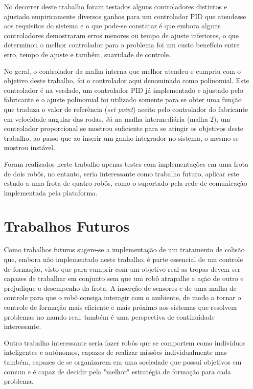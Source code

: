 No decorrer deste trabalho foram testados alguns controladores distintos e ajustado empiricamente diversos ganhos para um controlador PID que atendesse aos requisitos do sistema e o que pode-se constatar é que embora alguns controladores demostraram erros menores ou tempo de ajuste inferiores, o que determinou o melhor controlador para o problema foi um custo benefício entre erro, tempo de ajuste e também, suavidade de controle. 

No geral, o controlador da malha interna que melhor atendeu e cumpriu com o objetivo deste trabalho, foi o controlador aqui denominado como polinomial. %
Este controlador é na verdade, um controlador PID já implementado e ajustado pelo fabricante e o ajuste polinomial foi utilizado somente para se obter uma função que traduza o valor de referência (\emph{set point}) aceito pelo controlador do fabricante em velocidade angular das rodas. Já na malha intermediária (malha 2), um controlador proporcional se mostrou suficiente para se atingir os objetivos deste trabalho, ao passo que ao inserir um ganho integrador no sistema, o mesmo se mostrou instável.

Foram realizados neste trabalho apenas testes com implementações em uma frota de dois robôs, no entanto, seria interessante como trabalho futuro, aplicar este estudo a uma frota de quatro robôs, como o suportado pela rede de comunicação implementada pela plataforma. 

\section{Trabalhos Futuros}
 \label{sec:trabFuturos}
 Como trabalhos futuros sugere-se a implementação de um tratamento de colisão que, embora não implementado neste trabalho, é parte essencial de um controle de formação, visto que para cumprir com um objetivo real as tropas devem ser capazes de trabalhar em conjunto sem que um robô atrapalhe a ação de outro e prejudique o desempenho da frota. A inserção de sensores e de uma malha de controle para que o robô consiga interagir com o ambiente, de modo a tornar o controle de formação mais eficiente e mais próximo aos sistemas que resolvem problemas no mundo real, também é uma perspectiva de continuidade interessante.
 
 Outro trabalho interessante seria fazer robôs que se comportem como indivíduos inteligentes e autônomos, capazes de realizar missões individualmente mas também, capazes de se organizarem em uma sociedade que possui objetivos em comum e é capaz de decidir pela "melhor" estratégia de formação para cada problema.
 
 
